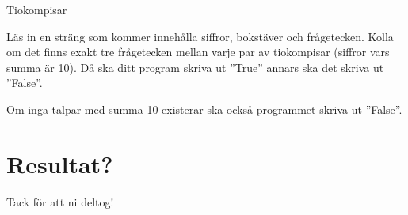 \documentclass[10pt]{beamer}
\begin{document}
\begin{frame}[fragile]{Tiokompisar}

Läs in en sträng som kommer innehålla siffror, bokstäver och frågetecken. Kolla om det finns exakt tre frågetecken mellan varje par av tiokompisar (siffror vars summa är 10). Då ska ditt program skriva ut ''True'' annars ska det skriva ut ''False''.

Om inga talpar med summa 10 existerar ska också programmet skriva ut ''False''.

\end{frame}



\section{Resultat?}


{
\begin{frame}[standout]
  Tack för att ni deltog!
\end{frame}
}
\end{document}
